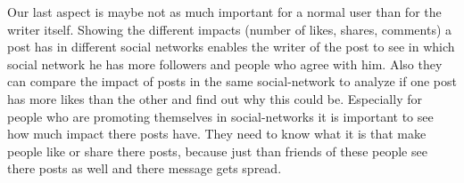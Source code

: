 Our last aspect is maybe not as much important for a normal user than for the writer itself. Showing the different impacts (number of likes, shares, comments) a post has in different social networks enables the writer of the post to see in which social network he has more followers and people who agree with him. Also they can compare the impact of posts in the same social-network to analyze if one post has more likes than the other and find out why this could be.  Especially for people who are promoting themselves in social-networks it is important to see how much impact there posts have. They need to know what it is that make people like or share there posts, because just than friends of these people see there posts as well and there message gets spread. 




